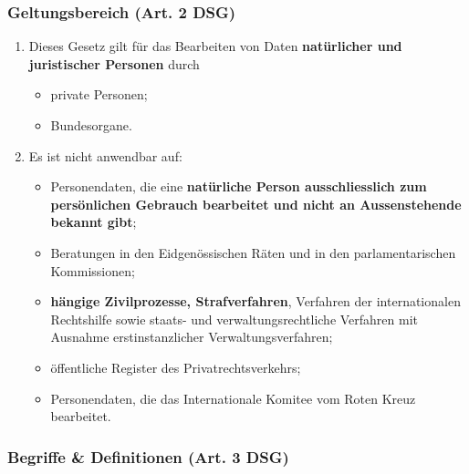 \subsubsection{Geltungsbereich (Art. 2 DSG)}
\label{sec:Datenschutz-Geltungsbereich}

\begin{enumerate}
	\tightlist
	\item Dieses Gesetz gilt für das Bearbeiten von Daten \textbf{natürlicher
	und juristischer Personen} durch
	\begin{itemize}
		\tightlist
		\item private Personen;
		\item Bundesorgane.
	\end{itemize}
	\item Es ist nicht anwendbar auf:
	\begin{itemize}
		\tightlist
		\item Personendaten, die eine \textbf{natürliche Person ausschliesslich
		zum persönlichen Gebrauch bearbeitet und nicht an Aussenstehende bekannt
		gibt};
		\item Beratungen in den Eidgenössischen Räten und in den
		parlamentarischen Kommissionen;
		\item \textbf{hängige Zivilprozesse, Strafverfahren}, Verfahren der
		internationalen Rechtshilfe sowie staats- und verwaltungsrechtliche
		Verfahren mit Ausnahme erstinstanzlicher Verwaltungsverfahren;
		\item öffentliche Register des Privatrechtsverkehrs;
		\item Personendaten, die das Internationale Komitee vom Roten Kreuz
		bearbeitet.
	\end{itemize}
\end{enumerate}


\subsubsection{Begriffe \& Definitionen (Art. 3 DSG)}
\label{sec:Datenschutz-Begriffe}

